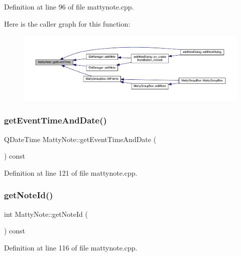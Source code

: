 Definition at line 96 of file mattynote.\+cpp.

Here is the caller graph for this function\+:
\nopagebreak
\begin{figure}[H]
\begin{center}
\leavevmode
\includegraphics[width=350pt]{classMattyNote_a879acc827b2dcc59e9ab43205a252542_icgraph}
\end{center}
\end{figure}
\hypertarget{classMattyNote_a1bcec093a330a5018b0eec56680d3b31}{}\label{classMattyNote_a1bcec093a330a5018b0eec56680d3b31} 
\subsubsection{\texorpdfstring{get\+Event\+Time\+And\+Date()}{getEventTimeAndDate()}}
{\footnotesize\ttfamily Q\+Date\+Time Matty\+Note\+::get\+Event\+Time\+And\+Date (\begin{DoxyParamCaption}{ }\end{DoxyParamCaption}) const}



Definition at line 121 of file mattynote.\+cpp.

\hypertarget{classMattyNote_a4ee4be12260363aa33a72cb40e19d2ed}{}\label{classMattyNote_a4ee4be12260363aa33a72cb40e19d2ed} 
\subsubsection{\texorpdfstring{get\+Note\+Id()}{getNoteId()}}
{\footnotesize\ttfamily int Matty\+Note\+::get\+Note\+Id (\begin{DoxyParamCaption}{ }\end{DoxyParamCaption}) const}



Definition at line 116 of file mattynote.\+cpp.

